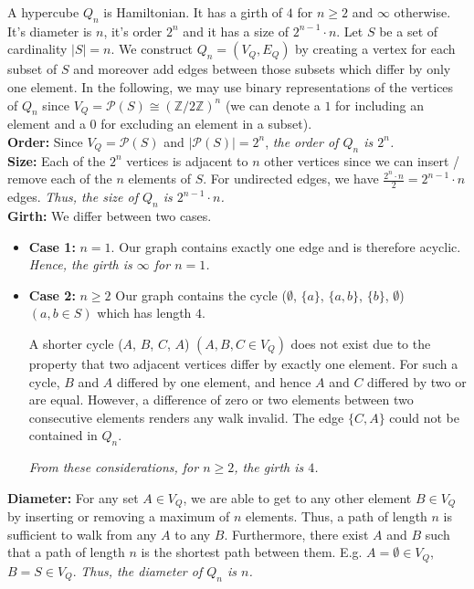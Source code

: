\documentclass[a4paper]{article}
\begin{document}
	\begin{solution}{9}
		\begin{theorem}{A hypercube $Q_n$ is Hamiltonian. It has a girth of $4$ for $n \geq 2$ and $\infty$ otherwise. It's diameter is $n$, it's order $2^n$ and it has a size of $2^{n-1} \cdot n$.}
			Let $S$ be a set of cardinality $|S| = n$. We construct $Q_n = (V_Q, E_Q)$ by creating a vertex for each subset of $S$ and moreover add edges between those subsets which differ by only one element. In the following, we may use binary representations of the vertices of $Q_n$ since $V_Q = \mathcal{P}(S) \cong (\mathbb{Z}/2\mathbb{Z})^n$ (we can denote a $1$ for including an element and a $0$ for excluding an element in a subset).\\

			\textbf{Order:} Since $V_Q = \mathcal{P}(S)$ and $|\mathcal{P}(S)| = 2^n$, \emph{the order of $Q_n$ is $2^n$.}\\

			\textbf{Size:} Each of the $2^n$ vertices is adjacent to $n$ other vertices since we can insert / remove each of the $n$ elements of $S$. For undirected edges, we have $\frac{2^n \cdot n}{2} = 2^{n-1} \cdot n$ edges. \emph{Thus, the size of $Q_n$ is $2^{n-1} \cdot n$.}\\

			\textbf{Girth:} We differ between two cases.
				\begin{itemize}
					\item \textbf{Case 1: } $n=1$. Our graph contains exactly one edge and is therefore acyclic. \emph{Hence, the girth is $\infty$ for $n=1$.}

					\item \textbf{Case 2: } $n\geq2$ Our graph contains the cycle ($\emptyset$, $\{a\}$, $\{a,b\}$, $\{b\}$, $\emptyset$) $(a,b \in S)$ which has length $4$.

						A shorter cycle ($A$, $B$, $C$, $A$) $(A, B, C \in V_Q)$ does not exist due to the property that two adjacent vertices differ by exactly one element. For such a cycle, $B$ and $A$ differed by one element, and hence $A$ and $C$ differed by two or are equal. However, a difference of zero or two elements between two consecutive elements renders any walk invalid. The edge $\{C, A\}$ could not be contained in $Q_n$.
 
						\emph{From these considerations, for $n \geq 2$, the girth is $4$.}
				\end{itemize}

			\textbf{Diameter:}
				For any set $A \in V_Q$, we are able to get to any other element $B \in V_Q$ by inserting or removing a maximum of $n$ elements. Thus, a path of length $n$ is sufficient to walk from any $A$ to any $B$. Furthermore, there exist $A$ and $B$ such that a path of length $n$ is the shortest path between them. E.g. $A = \emptyset \in V_Q$, $B = S \in V_Q$. \emph{Thus, the diameter of $Q_n$ is $n$.}\\


\end{theorem}
\end{solution}
\end{document}
